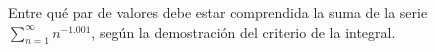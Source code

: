 \item Entre qué par de valores debe estar comprendida la suma de la serie $\displaystyle\sum_{n=1}^\infty n^{-1.001}$, según la demostración del criterio de la integral.
